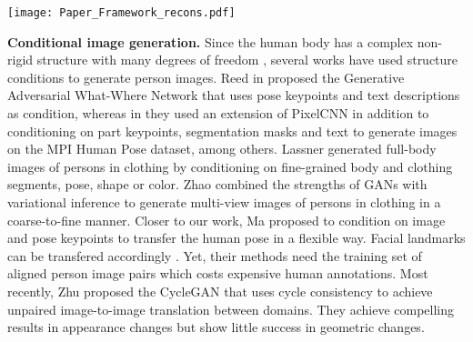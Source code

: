 \documentclass[10pt,twocolumn,letterpaper]{article}
\begin{document}
\begin{figure*}\centering
  \texttt{[image: Paper\_Framework\_recons.pdf]}\\
\vspace{-2.5mm}
  \caption{Stage-\RN{1}: disentangled image reconstruction. This framework is composed of three branches: foreground, background and pose. Note that we use a fully-connected auto-encoder network to reconstruct the pose (incl. keypoint coordinates and visibility), so that we can decode the embedded pose features to obtain the heatmaps at the sampling phase.}
\vspace{-3mm}
\label{fig:Paper_Framework_recons}
\end{figure*}

\textbf{Conditional image generation.} 
Since the human body has a complex non-rigid structure with many degrees of freedom \cite{moeslund2006survey}, several works have used structure conditions to generate person images. 
Reed \etal in \cite{Reed-NIPS2016} proposed the Generative Adversarial What-Where Network that uses pose keypoints and text descriptions as condition, whereas in \cite{reed2016-techreport} they used an extension of PixelCNN in addition to conditioning on part keypoints, segmentation masks and text to generate images on the MPI Human Pose dataset, among others. 
Lassner \etal \cite{Lassner17ClothNet} generated full-body images of persons in clothing by conditioning on fine-grained body and clothing segments, \eg pose, shape or color. 
Zhao \etal \cite{Zhao-Arxiv16-Multiview} combined the strengths of GANs with variational inference to generate multi-view images of persons in clothing in a coarse-to-fine manner. 
Closer to our work, Ma \etal \cite{PG2} proposed to condition on image and pose keypoints to transfer the human pose in a flexible way. Facial landmarks can be transfered accordingly \cite{SUN2018}. Yet, their methods need the training set of aligned person image pairs which costs expensive human annotations. 
Most recently, Zhu \etal \cite{CycleGAN} proposed the CycleGAN that uses cycle consistency to achieve unpaired image-to-image translation between domains. 
They achieve compelling results in appearance changes but show little success in geometric changes.
\end{document}
